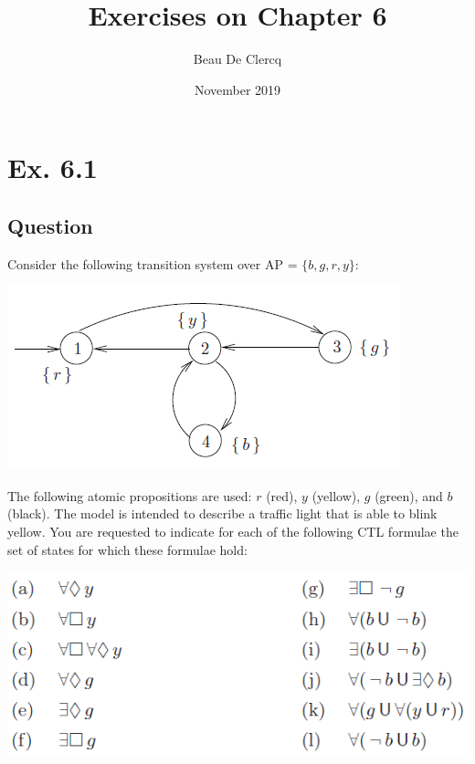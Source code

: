 \documentclass[12pt]{article}
\title{Exercises on Chapter 6}
\author{Beau De Clercq}
\date{November 2019}
\begin{document}
\maketitle{}


\clearpage
\newpage

\section*{Ex. 6.1}
\subsection*{Question}
Consider the following transition system over AP = $\{ b, g, r, y \}$:
\begin{center}
	\includegraphics*[scale=0.8]{ex61.png}
\end{center}
The following atomic propositions are used: $r$ (red), $y$ (yellow), $g$ (green), and $b$ (black). The
model is intended to describe a traffic light that is able to blink yellow. You are requested to
indicate for each of the following CTL formulae the set of states for which these formulae hold:
\begin{center}
	\includegraphics*[scale=0.8]{ex61statements.png}
\end{center}
\end{document}
